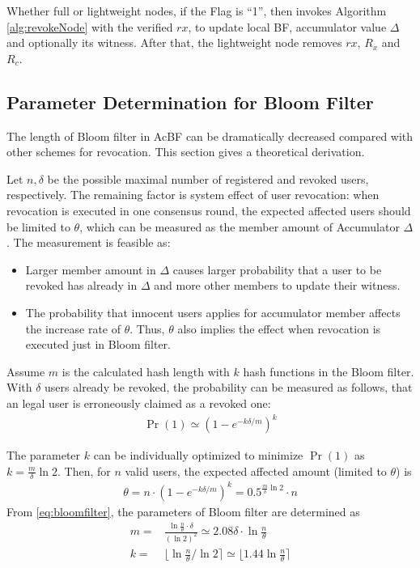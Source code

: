 \documentclass[conference]{IEEEtran}
\begin{document}
Whether full or lightweight nodes, if the Flag is ``1'', then invokes Algorithm \ref{alg:revokeNode} with the verified $rx$, to update local BF, accumulator value $\Delta$ and optionally its witness.
After that, the lightweight node removes $rx$, $R_x$ and $R_c$.

\subsection{Parameter Determination for Bloom Filter} \label{section:parameter}

The length of Bloom filter in AcBF can be dramatically decreased compared with other schemes for revocation. This section gives a theoretical derivation.

Let $n, \delta$ be the possible maximal number of registered and revoked users, respectively. The remaining factor is system effect of user revocation: when revocation is executed in one consensus round, the expected affected users should be limited to $\theta$, which can be measured as the member amount of Accumulator $\Delta$. The measurement is feasible as:
\begin{itemize}
    \item Larger member amount in $\Delta$ causes larger probability that a user to be revoked has already in $\Delta$ and more other members to update their witness.
    \item The probability that innocent users applies for accumulator member affects the increase rate of $\theta$. Thus, $\theta$ also implies the effect when revocation is executed just in Bloom filter.
\end{itemize}

Assume $m$ is the calculated hash length with $k$ hash functions in the Bloom filter. With $\delta$ users already be revoked, the probability can be measured as follows, that an legal user is erroneously claimed as a revoked one: 
\begin{align} 
    \Pr(1) \simeq (1 - e^{-k\delta/m})^k 
 \end{align}

The parameter $k$ can be individually optimized to minimize $\Pr(1)$ as $ k = \frac{m}{\delta}\ln 2$. Then, for $n$ valid users, the expected affected amount (limited to $\theta$) is 
\begin{align}\label{eq:bloomfilter}
    \theta = n \cdot (1 - e^{-k\delta/m})^{k} = 0.5^{\frac{m}{\delta}\ln 2}\cdot n
\end{align}
From \eqref{eq:bloomfilter}, the parameters of Bloom filter are determined as 
\begin{align}
m = & \frac{\ln \frac{n}{\theta} \cdot \delta}{(\ln 2)^2} \simeq 2.08\delta \cdot\ln \frac{n}{\theta}\\
k = & \lfloor \ln \frac{n}{\theta} / \ln 2 \rceil \simeq \lfloor 1.44 \ln \frac{n}{\theta} \rceil
\end{align}
\end{document}
